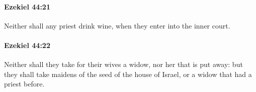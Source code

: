 		\paragraph{Ezekiel 44:21} %
			\label{EZEKIEL-44-21}

			Neither shall any priest drink wine, when they enter into the inner court.


		\paragraph{Ezekiel 44:22} %
			\label{EZEKIEL-44-22}

			Neither shall they take for their wives a widow, nor her that is put away: but they shall take maidens of the seed of the house of Israel, or a widow that had a priest before.



